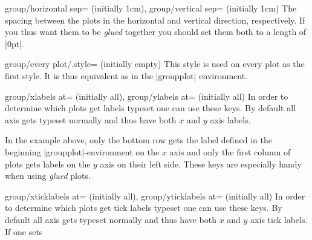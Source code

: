 {\begin{pgfplotskeylist}{group/horizontal sep= (initially 1cm),
      group/vertical sep= (initially 1cm)}
  The spacing between the plots in the horizontal and vertical direction, respectively. If you thus want them to be \textit{glued} together you should set
  them both to a length of |0pt|.
\end{pgfplotskeylist}

\begin{pgfplotskey}{group/every plot/.style= (initially empty)}
      This style is used on every plot as the first style. It is thus equivalent as  in the |groupplot| environment.
\end{pgfplotskey}

\begin{pgfplotskeylist}{%
	group/xlabels at= (initially all),%
	group/ylabels at= (initially all)}
  In order to determine which plots get labels typeset one can use these keys. By default all axis gets typeset normally and thus have both $x$ and
  $y$ axis labels. 
\begin{codeexample}[]
\end{codeexample}
In the example above, only the bottom row gets the label defined in the beginning |groupplot|-environment on the $x$ axis and only the first column of plots gets labels on the
$y$ axis on their left side. These keys are especially handy when using \textit{glued} plots.
\end{pgfplotskeylist}

\begin{pgfplotskeylist}{%
	group/xticklabels at= (initially all),%
	group/yticklabels at= (initially all)}
  In order to determine which plots get tick labels typeset one can use these keys. By default all axis gets typeset normally and thus have both $x$ and
  $y$ axis tick labels. If one sets


\end{pgfplotskeylist}}
